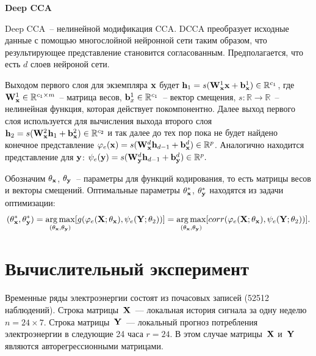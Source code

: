 \textbf{Deep CCA}

Deep CCA~-- нелинейной модификация CCA. DCCA преобразует исходные данные с помощью многослойной нейронной сети таким образом, что результирующее представление становится согласованным. Предполагается, что есть $d$ слоев нейроной сети. 

Выходом первого слоя для экземпляра $\mathbf{x}$ будет $\mathbf{h}_1 = s(\mathbf{W}^{1}_{\mathbf{x}}\mathbf{x} + \mathbf{b}^{1}_{\mathbf{x}}) \in \mathbb{R}^{c_1}$, где $\mathbf{W}_{\mathbf{x}}^{1} \in \mathbb{R}^{c_1 \times m}$~-- матрица весов, $\mathbf{b}_{x}^{1} \in \mathbb{R}^{c_1}$~-- вектор смещения, $s: \mathbb{R} \to \mathbb{R}$~-- нелинейная функция, которая действует покомпонентно. Далее выход первого слоя используется для вычисления выхода второго слоя $\mathbf{h}_{2} = s(\mathbf{W}^{2}_{\mathbf{x}}\mathbf{h}_{1} + \mathbf{b}^{2}_{\mathbf{x}}) \in \mathbb{R}^{c_2}$ и так далее до тех пор пока не будет найдено конечное представление $\varphi_e(\mathbf{x}) = s(\mathbf{W}^{d}_{\mathbf{x}}\mathbf{h}_{d-1} + \mathbf{b}^{d}_{\mathbf{x}}) \in \mathbb{R}^{p}$. Аналогично находится представление для $\mathbf{y}$: $\psi_e(\mathbf{y}) = s(\mathbf{W}^{d}_{\mathbf{y}}\mathbf{h}_{d-1} + \mathbf{b}^{d}_{\mathbf{y}}) \in \mathbb{R}^{p}.$

Обозначим $\theta_{\mathbf{x}}$, $\theta_{\mathbf{y}}$~-- параметры для функций кодирования, то есть матрицы весов и векторы смещений. Оптимальные параметры $\theta_{\mathbf{x}}^{*}$, $\theta_{\mathbf{y}}^{*}$ находятся из задачи оптимизации:
\begin{equation}
(\theta_{\mathbf{x}}^{*}, \theta_{\mathbf{y}}^{*}) = \mathop{\arg \max}\limits _{(\theta_{\mathbf{x}}, \theta_{\mathbf{y}})} [g(\varphi_e(\mathbf{X}; \theta_{\mathbf{x}}), \psi_e(\mathbf{Y}; \theta_{2}))] = \mathop{\arg \max}\limits _{(\theta_{\mathbf{x}}, \theta_{\mathbf{y}})} [corr(\varphi_e(\mathbf{X}; \theta_{\mathbf{x}}), \psi_e(\mathbf{Y}; \theta_{2}))].
\end{equation}

\section{Вычислительный эксперимент}

Временные ряды электроэнергии состоят из почасовых записей (52512 наблюдений). 
Строка матрицы~$\mathbf{X}$~--– локальная история сигнала за одну неделю $n = 24 \times 7$. Строка матрицы~$\mathbf{Y}$~--- локальный прогноз потребления электроэнергии в следующие 24 часа $r = 24$. В этом случае матрицы~$\mathbf{X}$ и~$\mathbf{Y}$ являются авторегрессионными матрицами.


